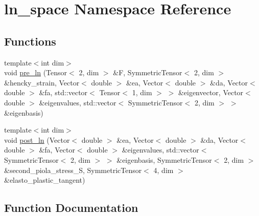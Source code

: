 \hypertarget{namespaceln__space}{}\section{ln\+\_\+space Namespace Reference}
\label{namespaceln__space}
\subsection*{Functions}
\begin{DoxyCompactItemize}
\item 
{\footnotesize template$<$int dim$>$ }\\void \hyperlink{namespaceln__space_a85e361462746b126386ad7e1d608e7d8}{pre\+\_\+ln} (Tensor$<$ 2, dim $>$ \&F, Symmetric\+Tensor$<$ 2, dim $>$ \&hencky\+\_\+strain, Vector$<$ double $>$ \&ea, Vector$<$ double $>$ \&da, Vector$<$ double $>$ \&fa, std\+::vector$<$ Tensor$<$ 1, dim $>$ $>$ \&eigenvector, Vector$<$ double $>$ \&eigenvalues, std\+::vector$<$ Symmetric\+Tensor$<$ 2, dim $>$ $>$ \&eigenbasis)
\item 
{\footnotesize template$<$int dim$>$ }\\void \hyperlink{namespaceln__space_a0f5e3bde0b1ee47f3dbc5977b4653342}{post\+\_\+ln} (Vector$<$ double $>$ \&ea, Vector$<$ double $>$ \&da, Vector$<$ double $>$ \&fa, Vector$<$ double $>$ \&eigenvalues, std\+::vector$<$ Symmetric\+Tensor$<$ 2, dim $>$ $>$ \&eigenbasis, Symmetric\+Tensor$<$ 2, dim $>$ \&second\+\_\+piola\+\_\+stress\+\_\+S, Symmetric\+Tensor$<$ 4, dim $>$ \&elasto\+\_\+plastic\+\_\+tangent)
\end{DoxyCompactItemize}


\subsection{Function Documentation}
